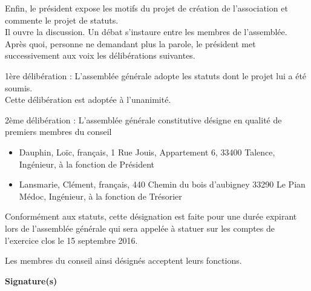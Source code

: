 \documentclass[a4paper,11pt]{article}
\begin{document}
Enfin, le président expose les motifs du projet de création de l'association et commente le projet de statuts.\\
Il ouvre la discussion. Un débat s'instaure entre les membres de l'assemblée.\\
Après quoi, personne ne demandant plus la parole, le président met successivement aux voix les délibérations suivantes.\bigskip

1ère délibération : L'assemblée générale adopte les statuts dont le projet lui a été soumis.\\
Cette délibération est adoptée à l'unanimité.

2ème délibération : L'assemblée générale constitutive désigne en qualité de premiers membres du conseil
\begin{itemize}
	\item Dauphin, Loïc, français, 1 Rue Jouis, Appartement 6, 33400 Talence, Ingénieur, à la fonction de Président
	\item Lansmarie, Clément, français, 440 Chemin du bois d'aubigney 33290 Le Pian Médoc, Ingénieur, à la fonction de Trésorier
\end{itemize}\bigskip

Conformément aux statuts, cette désignation est faite pour une durée expirant lors de l'assemblée générale qui sera appelée à statuer sur les comptes de l'exercice clos le 15 septembre 2016.\bigskip

Les membres du conseil ainsi désignés acceptent leurs fonctions.

\begin{center}
	\textbf{Signature(s)}
\end{center}
\end{document}

